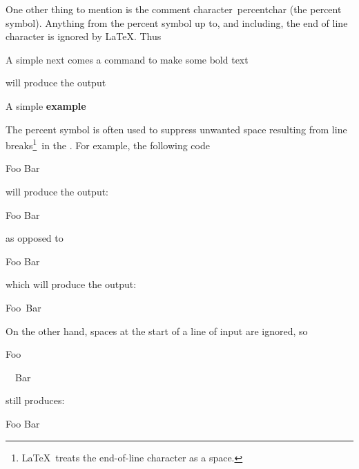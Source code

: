 \label{obj:comment}
One other thing to mention is the comment character~\gls{percentchar}
(the percent symbol). Anything from the percent symbol up to, and
including, the end of line character is ignored by \LaTeX. Thus
\begin{code}
A simple  next comes a command to make some bold text\newline
{} 
\end{code}%
will produce the output
\begin{resultS}
A simple %
\textbf{example} 
\end{resultS}%
\label{obj:suppresseol}%
The percent symbol is often used to suppress unwanted space 
resulting from line breaks\footnote{\LaTeX\ treats the end-of-line
character as a space.}\ in the .
For example, the following code
\begin{code}
Foo\newline
Bar
\end{code}%
will produce the output:
\begin{resultS}
Foo%
Bar
\end{resultS}%
as opposed to
\begin{code}
Foo\newline
Bar
\end{code}%
which will produce the output:
\begin{resultS}
Foo\ Bar\relax%
\end{resultS}%
On the other hand, spaces at the start of a line of input are
ignored, so
\begin{code}
Foo\newline
\strut~~Bar
\end{code}
still produces:
\begin{resultS}[FooBar]
Foo%
  Bar
\end{resultS}

